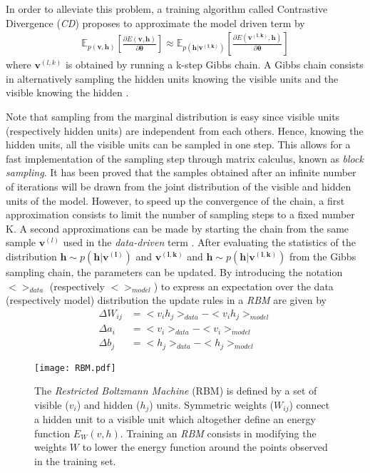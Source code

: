 \documentclass{amsart}
\begin{document}
	In order to alleviate this problem, a training algorithm called Contrastive Divergence (\textit{CD}) \cite{hinton2002training} proposes to approximate the model driven term by
	\begin{equation}
	\label{eq:grad_log_like}
	\begin{split}
	\mathbb{E}_{p(\bm{v} , \bm{h})} \left[ \frac{\partial E(\bm{v},\bm{h})}{\partial \bm{\theta}} \right]
	\approx 
	\mathbb{E}_{p(\bm{h} | \bm{v^{(l,k)}})} \left[ \frac{\partial E(\bm{v^{(l,k)}},\bm{h})}{\partial \bm{\theta}} \right]
	\end{split}
	\end{equation}
	where $\bm{v}^{(l,k)}$ is obtained by running a k-step Gibbs chain. A Gibbs chain consists in alternatively sampling the hidden units knowing the visible units  and the visible knowing the hidden .
	
	Note that sampling from the marginal distribution is easy since visible units (respectively hidden units) are independent from each others. Hence, knowing the hidden units, all the visible units can be sampled in one step. This allows for a fast implementation of the sampling step through matrix calculus, known as \textit{block sampling}.
	It has been proved \cite{bengio2009learning} that the samples obtained after an infinite number of iterations will be drawn from the joint distribution of the visible and hidden units of the model. However, to speed up the convergence of the chain, a first approximation consists to limit the number of sampling steps to a fixed number K.
	A second approximations can be made by starting the chain from the same sample $\bm{v}^{(l)}$ used in the \textit{data-driven} term \cite{hinton2010practical}. After evaluating the statistics of the distribution $\bm{h} \sim p(\bm{h}|\bm{v^{(l)}})$ and $\bm{v^{(l,k)}}$ and $\bm{h}\sim p(\bm{h}|\bm{v^{(l,k)}})$ from the Gibbs sampling chain, the parameters can be updated. By introducing the notation $<>_{data}$ (respectively $<>_{model}$) to express an expectation over the data (respectively model) distribution the update rules in a \textit{RBM} are given by
	\begin{align}
	\Delta W_{ij} &= <v_{i}h_{j} >_{data} - <v_{i}h_{j} >_{model}\\
	\Delta a_{i} &= <v_{i}>_{data} - <v_{i}>_{model}\\
	\Delta b_{j} &= <h_{j} >_{data} - <h_{j} >_{model}
	\end{align}
	\begin{figure}[h]
		\centering
		\texttt{[image: RBM.pdf]}
		\caption{The \textit{Restricted Boltzmann Machine} (RBM) is defined by a set of visible ($v_{i}$) and hidden ($h_{j}$) units.  Symmetric weights ($W_{ij}$) connect a hidden unit to a visible unit which altogether define an energy function $E_{W}(v,h)$. Training an \textit{RBM} consists in modifying the weights $W$ to lower the energy function around the points observed in the training set.}
		\label{fig:RBM}
	\end{figure}
	
\end{document}
